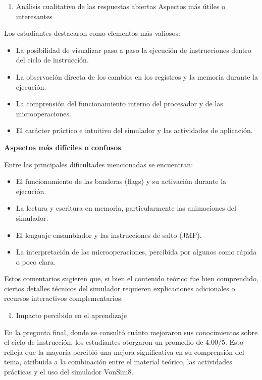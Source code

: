 \documentclass[12pt,oneside]{templates/unerthesis}
\providecommand{\tightlist}{%
  \setlength{\itemsep}{0pt}\setlength{\parskip}{0pt}}
\begin{document}
\begin{enumerate}
\def\labelenumi{\arabic{enumi}.}
\setcounter{enumi}{3}
\tightlist
\item
  Análisis cualitativo de las respuestas abiertas
  Aspectos más útiles o interesantes
\end{enumerate}

Los estudiantes destacaron como elementos más valiosos:

\begin{itemize}
\item
  La posibilidad de visualizar paso a paso la ejecución de instrucciones dentro del ciclo de instrucción.
\item
  La observación directa de los cambios en los registros y la memoria durante la ejecución.
\item
  La comprensión del funcionamiento interno del procesador y de las microoperaciones.
\item
  El carácter práctico e intuitivo del simulador y las actividades de aplicación.
\end{itemize}

\textbf{Aspectos más difíciles o confusos}

Entre las principales dificultades mencionadas se encuentran:

\begin{itemize}
\item
  El funcionamiento de las banderas (flags) y su activación durante la ejecución.
\item
  La lectura y escritura en memoria, particularmente las animaciones del simulador.
\item
  El lenguaje ensamblador y las instrucciones de salto (JMP).
\item
  La interpretación de las microoperaciones, percibida por algunos como rápida o poco clara.
\end{itemize}

Estos comentarios sugieren que, si bien el contenido teórico fue bien comprendido, ciertos detalles técnicos del simulador requieren explicaciones adicionales o recursos interactivos complementarios.

\begin{enumerate}
\def\labelenumi{\arabic{enumi}.}
\setcounter{enumi}{4}
\tightlist
\item
  Impacto percibido en el aprendizaje
\end{enumerate}

En la pregunta final, donde se consultó cuánto mejoraron sus conocimientos sobre el ciclo de instrucción, los estudiantes otorgaron un promedio de 4.00/5.
Esto refleja que la mayoría percibió una mejora significativa en su comprensión del tema, atribuida a la combinación entre el material teórico, las actividades prácticas y el uso del simulador VonSim8.
\end{document}
